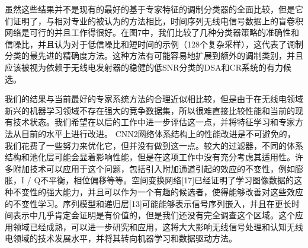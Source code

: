 虽然这些结果并不是现有的最好的基于专家特征的调制分类器的全面比较，但是它们证明了，与相对专业的被认为的方法相比，时间序列无线电信号数据上的盲卷积网络是可行的并且工作得很好。在图7中，我们比较了几种分类器策略的准确性和信噪比，并且认为对于低信噪比和短时间的示例（128个复杂采样），这代表了调制分类的最先进的精确度方法。这种方法有可能容易地扩展到额外的调制类别，并且应该被视为依赖于无线电发射器的稳健的低SNR分类的DSA和CR系统的有力候选。\par


我们的结果与当前最好的专家系统方法的合理近似相比较，但是由于在无线电领域新兴的机器学习领域不存在强大的竞争数据集，所以很难直接比较性能和当前的现有技术状态。我们希望在以后的工作中进一步评估这一点，并将特征学习和专家方法从目前的水平上进行改进。 CNN2网络体系结构上的性能改进是不可避免的，我们花费了一些努力来优化它，但并没有做到这一点。较大的过滤器，不同的体系结构和池化层可能会显着影响性能，但是在这项工作中没有充分考虑其适用性。许多附加技术可以应用于这个问题，包括引入附加通道引起的效应的不变性，例如膨胀，I / Q不平衡，相位偏移等等。空间变换网络[17]已经证明了学习图像数据的这种不变性的强大能力，并且可以作为一个有趣的候选者，使得能够改善对这些效应的不变性学习。序列模型和递归层[13]可能能够表示信号序列嵌入，并且在更长时间表示中几乎肯定会证明是有价值的，但是我们还没有完全调查这个区域。这个应用领域已经成熟，可以进一步研究和应用，这将大大影响无线信号处理和认知无线电领域的技术发展水平，并将其转向机器学习和数据驱动方法。\par

